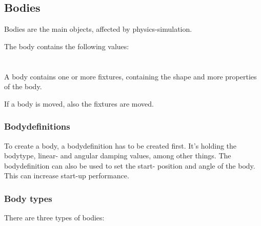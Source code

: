 \documentclass[10pt,a4paper,DIV=11]{scrreprt}
\begin{document}
\subsection{Bodies}
Bodies are the main objects, affected by physics-simulation.

The body contains the following values: \\

   \\
\\



A body contains one or more fixtures, containing the shape and more properties of the body.

If a body is moved, also the fixtures are moved.

\subsubsection*{Bodydefinitions}
To create a body, a bodydefinition has to be created first. It's holding the bodytype, linear- and angular damping values, among other things.
The bodydefinition can also be used to set the start- position and angle of the body. This can increase start-up performance.

\subsubsection*{Body types}
There are three types of bodies:

   \\
\\
\end{document}
